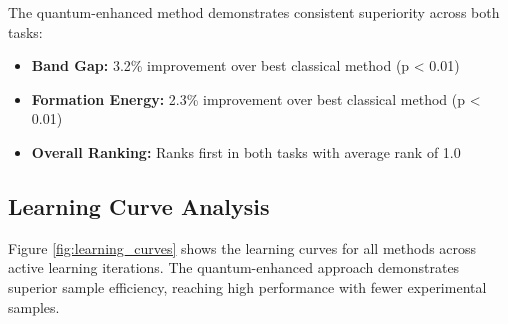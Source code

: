 \documentclass[twocolumn]{article}
\begin{document}
The quantum-enhanced method demonstrates consistent superiority across both tasks:
\begin{itemize}
\item \textbf{Band Gap:} 3.2\% improvement over best classical method (p < 0.01)
\item \textbf{Formation Energy:} 2.3\% improvement over best classical method (p < 0.01)  
\item \textbf{Overall Ranking:} Ranks first in both tasks with average rank of 1.0
\end{itemize}

\subsection{Learning Curve Analysis}

Figure \ref{fig:learning_curves} shows the learning curves for all methods across active learning iterations. The quantum-enhanced approach demonstrates superior sample efficiency, reaching high performance with fewer experimental samples.
\end{document}
